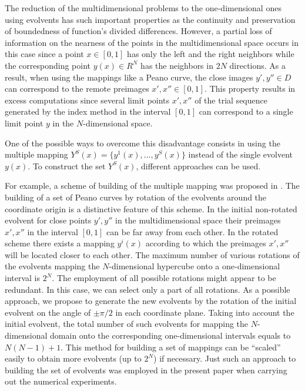 \documentclass[smallextended]{svjour3}       %
\begin{document}
The reduction of the multidimensional problems to the one-dimensional ones using evolvents 
has such important properties as the continuity and preservation of boundedness of function's 
divided differences. However, a partial loss of information on the nearness of the points in the 
multidimensional space occurs in this case since a point $x \in [0,1]$ has only the left and the 
right neighbors while the corresponding point $y(x) \in R^N$ has the neighbors in $2N$ 
directions. As a result, when using the mappings like a Peano curve, the close images $y', y'' \in 
D$ can correspond to the remote preimages $x', x'' \in [0,1]$. This property results in excess 
computations since several limit points $x', x''$ of the trial sequence generated by the index 
method in the interval $[0,1]$ can correspond to a single limit point $y$ in the $N$-dimensional 
space.

One of the possible ways to overcome this disadvantage consists in using the multiple mapping 
$Y^S(x)=\{ y^1 (x),...,y^S(x)\}$ instead of the single evolvent $y(x)$. To construct the set 
$Y^S(x)$, different approaches can be used. 

For example, a scheme of building of the multiple mapping was proposed in \cite{6_Gergel2009}. The building of a set of Peano curves by rotation of the evolvents 
around the coordinate origin is a distinctive feature of this scheme. In the initial non-rotated 
evolvent for close points $y', y''$ in the multidimensional space their preimages $x', x''$ in the 
interval $[0,1]$ can be far away from each other. In the rotated scheme there exists a mapping 
$y^i(x)$ according to which the preimages $x', x''$ will be located closer to each other. The 
maximum number of various rotations of the evolvents mapping the $N$-dimensional 
hypercube onto a one-dimensional interval is $2^N$. The employment of all possible rotations 
might appear to be redundant. In this case, we can select only a part of all rotations. As a 
possible approach, we propose to generate the new evolvents by the rotation of the initial 
evolvent on the angle of $\pm\pi/2$ in each coordinate plane. Taking into account the initial 
evolvent, the total number of such evolvents for mapping the $N$-dimensional domain onto the 
corresponding one-dimensional intervals equals to $N(N-1)+1$. This method for building a set 
of mappings can be ``scaled'' easily to obtain more evolvents (up to $2^N$) if necessary.
Just such an approach to building the set of evolvents was employed in the present paper when 
carrying out the numerical experiments. 
\end{document}
